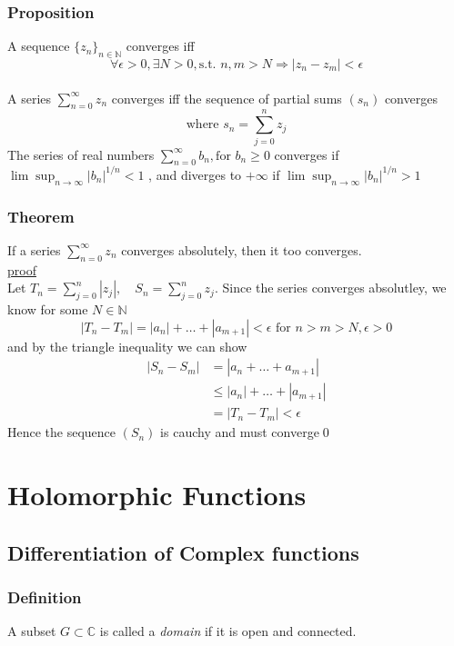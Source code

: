 \documentclass[a4paper, 12pt, twoside]{article}
\begin{document}
            \subsubsection{Proposition}
                A sequence $\{z_{n}\}_{n\in \mathbb{N}}$ converges iff
                $$ \forall\epsilon>0,\exists N>0, \text{s.t. } n,m>N \Rightarrow |z_{n}-z_{m}|<\epsilon$$\\
                \noindent
                A series $ \sum_{n=0}^{\infty}z_{n}$ converges iff the sequence of partial sums $(s_{n})$ converges
                $$\text{where } s_{n}=\sum_{j=0}^{n}z_{j}$$
                \noindent
                The series of real numbers $ \sum_{n=0}^{\infty}b_{n}, \text{for } b_{n}\geq 0$ converges if $\lim\sup_{n\to\infty}|b_{n}|^{1/n}<1$ , and diverges to $+\infty$ if $\lim\sup_{n\to\infty}|b_{n}|^{1/n}>1$

            \subsubsection{Theorem}
                If a series $ \sum_{n=0}^{\infty}z_{n}$ converges absolutely, then it too converges.\\
                \underline{proof}\\
                Let $T_{n}=\sum_{j=0}^{n}|z_{j}|,\quad S_{n}=\sum_{j=0}^{n}z_{j}$. Since the series converges absolutley, we know for some $N\in \mathbb{N}$
                $$|T_{n}-T_{m}|=|a_{n}|+\dots+|a_{m+1}|<\epsilon \text{ for }n>m>N, \epsilon>0$$
                and by the triangle inequality we can show
                \begin{align*}
                    |S_{n}-S_{m}|&=|a_{n}+\dots+a_{m+1}|\\
                    &\leq |a_{n}|+\dots+|a_{m+1}| \\
                    &=|T_{n}-T_{m}|< \epsilon
                \end{align*}
                 Hence the sequence $(S_{n})$ is cauchy and must converge\qed
        \newpage
        \section{Holomorphic Functions}
            \subsection{Differentiation of Complex functions}
                \subsubsection{Definition}
                    A subset $G\subset \mathbb{C}$ is called a \emph{domain} if it is open and connected.
\end{document}
